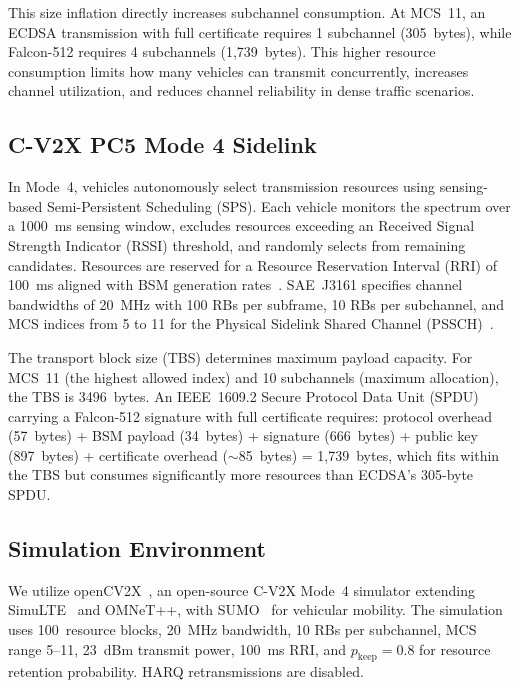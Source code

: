 \documentclass[conference]{IEEEtran}
\begin{document}
This size inflation directly increases subchannel consumption. At MCS~11, an ECDSA transmission with full certificate requires 1 subchannel (305~bytes), while Falcon-512 requires 4 subchannels (1,739~bytes). This higher resource consumption limits how many vehicles can transmit concurrently, increases channel utilization, and reduces channel reliability in dense traffic scenarios.

\subsection{C-V2X PC5 Mode 4 Sidelink}

In Mode~4, vehicles autonomously select transmission resources using sensing-based Semi-Persistent Scheduling (SPS). Each vehicle monitors the spectrum over a 1000~ms sensing window, excludes resources exceeding an Received Signal Strength Indicator (RSSI) threshold, and randomly selects from remaining candidates. Resources are reserved for a Resource Reservation Interval (RRI) of 100~ms aligned with BSM generation rates~\cite{molina2017lte}. SAE~J3161 specifies channel bandwidths of 20~MHz with 100 RBs per subframe, 10 RBs per subchannel, and MCS indices from 5 to 11 for the Physical Sidelink Shared Channel (PSSCH)~\cite{sae_j3161}.

The transport block size (TBS) determines maximum payload capacity. For MCS~11 (the highest allowed index) and 10 subchannels (maximum allocation), the TBS is 3496~bytes. An IEEE~1609.2 Secure Protocol Data Unit (SPDU) carrying a Falcon-512 signature with full certificate requires: protocol overhead (57~bytes) + BSM payload (34~bytes) + signature (666~bytes) + public key (897~bytes) + certificate overhead ($\sim$85~bytes) = 1,739~bytes, which fits within the TBS but consumes significantly more resources than ECDSA's 305-byte SPDU.

\subsection{Simulation Environment}

We utilize openCV2X~\cite{opencv2x}, an open-source C-V2X Mode~4 simulator extending SimuLTE~\cite{virdis2014simulte} and OMNeT++, with SUMO~\cite{lopez2018sumo} for vehicular mobility. The simulation uses 100~resource blocks, 20~MHz bandwidth, 10 RBs per subchannel, MCS range 5--11, 23~dBm transmit power, 100~ms RRI, and $p_{\text{keep}}=0.8$ for resource retention probability. HARQ retransmissions are disabled.
\end{document}
